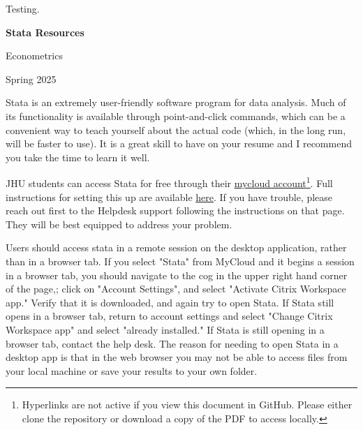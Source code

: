 \documentclass{article}
\begin{document}
Testing.

\begin{center}
    \Large
    \textbf{Stata Resources}
    \normalsize

    \vspace{1mm}

    Econometrics

    \vspace{1mm}

    Spring 2025
\end{center}
\medskip

Stata is an extremely user-friendly software program for data analysis. Much of its functionality is available through point-and-click commands, which can be a convenient way to teach yourself about the actual code (which, in the long run, will be faster to use). It is a great skill to have on your resume and I recommend you take the time to learn it well.

\vspace{2mm}

JHU students can access Stata for free through their \href{http://mycloud.jh.edu/}{mycloud account}\footnote{Hyperlinks are not active if you view this document in GitHub. Please either clone the repository or download a copy of the PDF to access locally.}. Full instructions for setting this up are available \href{https://studentaffairs.jhu.edu/computing/campus-resources/myjlab/}{here}. If you have trouble, please reach out first to the Helpdesk support following the instructions on that page. They will be best equipped to address your problem.

\vspace{2mm}

Users should access stata in a remote session on the desktop application, rather than in a browser tab. If you select "Stata" from MyCloud and it begins a session in a browser tab, you should navigate to the cog in the upper right hand corner of the page,; click on "Account Settings", and select "Activate Citrix Workspace app." Verify that it is downloaded, and again try to open Stata. If Stata still opens in a browser tab, return to account settings and select "Change Citrix Workspace app" and select "already installed." If Stata is still opening in a browser tab, contact the help desk. The reason for needing to open Stata in a desktop app is that in the web browser you may not be able to access files from your local machine or save your results to your own folder. 

\vspace{2mm}
\end{document}
